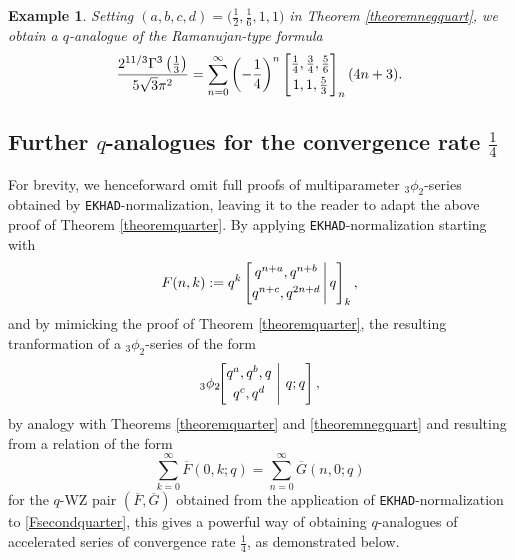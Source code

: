 \documentclass[12pt]{article}
\newtheorem{example}{Example}
\begin{document}
\begin{example}
 Setting $(a, b, c, d) = \big( \frac{1}{2}, \frac{1}{6}, 1, 1 \big)$ in Theorem \ref{theoremnegquart}, we obtain 
 a $q$-analogue of the Ramanujan-type formula 
\begin{equation*}
 \frac{2^{11/3} \Gamma^{3}\left( \frac{1}{3} \right)}{ 5 \sqrt{3} \pi^2 } = 
 \sum_{n = 0}^{\infty} 
 \left( -\frac{1}{4} \right)^{n} \left[ \begin{matrix} 
 \frac{1}{4}, \frac{3}{4}, \frac{5}{6} 
 \vspace{1mm} \\ 
 1, 1, \frac{5}{3}
 \end{matrix} \right]_{n} (4 n + 3). 
 \end{equation*}
\end{example}

\subsection{Further $q$-analogues for the convergence rate $\frac{1}{4}$}\label{suqqqqbqqquqqaqrqtqer}
 For brevity, we henceforward omit full proofs of multiparameter ${}_{3}\phi_{2}$-series obtained
 by {\tt EKHAD}-normalization, 
 leaving it to the reader to adapt 
 the above proof of 
 Theorem \ref{theoremquarter}. 
 By applying {\tt EKHAD}-normalization
 starting with 
\begin{equation}\label{Fsecondquarter}
 F(n, k) := q^{k} \left[ \begin{matrix} 
 q^{n + a}, q^{n+b} \vspace{1mm} \\ 
 q^{n+c}, q^{2n+d} \end{matrix} \, \Bigg| \, q \right]_{k}, 
\end{equation}
 and by mimicking the proof of 
 Theorem \ref{theoremquarter}, 
 the resulting tranformation of a ${}_{3}\phi_{2}$-series of the form 
 $$ {}_{3}\phi_{2}\!\!\left[ \begin{matrix} 
 q^{a}, q^{b}, q \vspace{1mm}\\ 
 q^{c}, q^{d} \end{matrix} \ \Bigg| \ q; q 
 \right], $$
 by analogy with Theorems \ref{theoremquarter} 
 and \ref{theoremnegquart} and resulting from a relation of the form 
 $$ \sum_{k=0}^{\infty} \overline{F}(0, k;q) = \sum_{n=0}^{\infty} \overline{G}(n,0;q) $$
 for the $q$-WZ pair $(\overline{F}, \overline{G})$
 obtained from the application of {\tt EKHAD}-normalization to 
 \eqref{Fsecondquarter}, this gives a powerful way of obtaining 
 $q$-analogues of accelerated series of convergence rate $\frac{1}{4}$, 
 as demonstrated below. 
\end{document}
